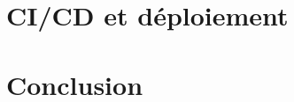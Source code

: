 \documentclass[
    iict, %
    il, %
]{heig-tb}
\begin{document}
\chapter{CI/CD et déploiement}


% 

\chapter{Conclusion}


\clearpage
\printbibliography






\let\cleardoublepage\clearpage
\backmatter

\label{glossaire}
\printnoidxglossary
\label{index}
\printindex

% 
\end{document}
